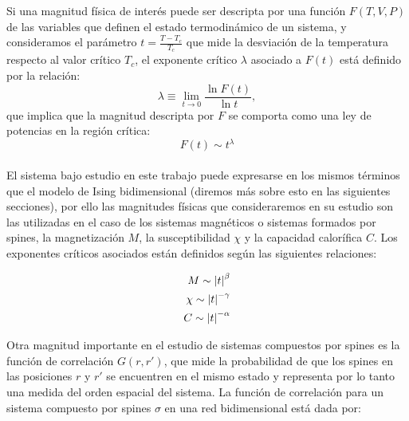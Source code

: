 Si una magnitud física de interés puede ser descripta por una función $F(T, V, P)$
 de las variables que definen el estado termodinámico de un sistema, y
 consideramos el parámetro $t=\frac{T-T_{c}}{T_{c}}$ que mide la desviación de
 la temperatura respecto al valor crítico $T_{c}$, el exponente crítico $\lambda${}
 asociado a $F(t)$ está definido por la relación:
\\
\begin{equation}
	\lambda\equiv \lim_{t \to 0}\frac{\ln{F(t)}}{\ln{t}},
	\label{eq:defexpcrit}
\end{equation}
 que implica que la magnitud descripta por $F$ se comporta como una ley de
 potencias en la región crítica:
\begin{equation}
	F(t)\sim t^{\lambda}
	\label{eq:leypot}
\end{equation}
\\
El sistema bajo estudio en este trabajo puede expresarse en los mismos términos
 que el modelo de Ising bidimensional (diremos más sobre esto en las siguientes
 secciones), por ello las magnitudes físicas que consideraremos en su estudio
 son las utilizadas en el caso de los sistemas magnéticos o sistemas formados por spines,
 la magnetización $M$, la susceptibilidad $\chi$ y la capacidad calorífica $C$. Los exponentes
 críticos asociados están definidos según las siguientes relaciones:
\\
\begin{center} 
\begin{eqnarray}
	\label{eq:expcrit_mag}
	M\sim \left\vert t\right\vert^{\beta} \\
	\label{eq:expcrit_susc}
	\chi\sim \left\vert t\right\vert^{-\gamma} \\
	\label{eq:expcrit_cap}
	C\sim \left\vert t\right\vert^{-\alpha} \\
\end{eqnarray}
\end{center}
Otra magnitud importante en el estudio de sistemas compuestos por spines es la
 función de correlación $G(r, r')$, que mide la probabilidad de que los spines en las
  posiciones $r$ y $r'$ se encuentren en el mismo estado y representa por lo tanto
  una medida del orden espacial del sistema. La función de correlación para un sistema
  compuesto por spines $\sigma$ en una red bidimensional está dada por:

